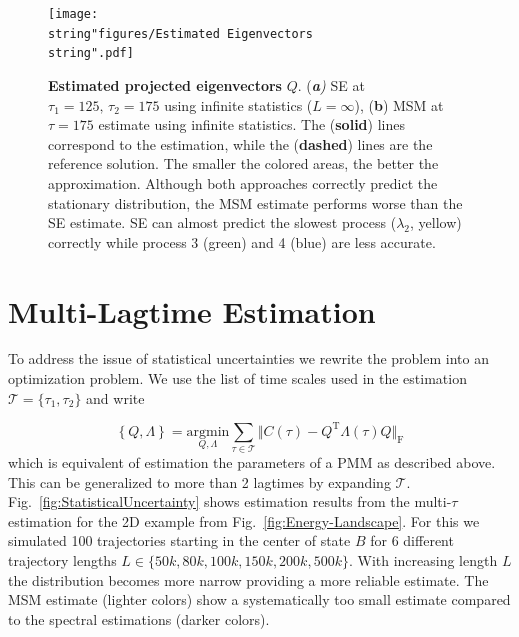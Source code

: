 \documentclass[aps,pre,twocolumn,nofootinbib,superscriptaddress,linenumbers]{revtex4-1}
\begin{document}
\begin{figure}
\begin{centering}
\texttt{[image: \\string"figures/Estimated Eigenvectors\\string".pdf]}
\par\end{centering}

\centering{}\textbf{\label{fig:Estimation-results-EVec}Estimated projected eigenvectors}
$Q$. (\textbf{\emph{a}}\emph{)} SE at $\tau_{1}=125,\,\tau_{2}=175$
using infinite statistics ($L=\infty$), (\textbf{b}) MSM at $\tau=175$
estimate using infinite statistics. The (\textbf{solid}) lines correspond
to the estimation, while the (\textbf{dashed}) lines are the reference
solution. The smaller the colored areas, the better the approximation.
Although both approaches correctly predict the stationary distribution,
the MSM estimate performs worse than the SE estimate. SE can almost
predict the slowest process ($\lambda_{2}$, yellow) correctly while
process 3 (green) and 4 (blue) are less accurate.
\end{figure}



\section{Multi-Lagtime Estimation}

To address the issue of statistical uncertainties we rewrite the problem
into an optimization problem. We use the list of time scales used
in the estimation $\mathcal{T}=\{\tau_{1},\tau_{2}\}$ and write

\[
\left\{ Q,\Lambda\right\} =\underset{Q,\Lambda}{\text{argmin}}\sum_{\tau\in\mathcal{T}}\Vert C(\tau)-Q^{\text{T}}\Lambda(\tau)Q\Vert_{\text{F}}
\]
which is equivalent of estimation the parameters of a PMM as described
above. This can be generalized to more than 2 lagtimes by expanding
$\mathcal{T}$. Fig.~\ref{fig:StatisticalUncertainty} shows estimation
results from the multi-$\tau$ estimation for the 2D example from
Fig.~\ref{fig:Energy-Landscape}. For this we simulated 100 trajectories
starting in the center of state $B$ for 6 different trajectory lengths
$L\in\{50k,80k,100k,150k,200k,500k\}$. With increasing length $L$
the distribution becomes more narrow providing a more reliable estimate.
The MSM estimate (lighter colors) show a systematically too small
estimate compared to the spectral estimations (darker colors).
\end{document}
